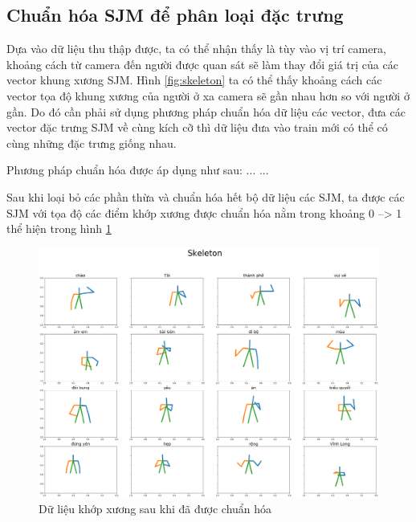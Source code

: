 \subsection{Chuẩn hóa SJM để phân loại đặc trưng}

Dựa vào dữ liệu thu thập được, ta có thể nhận thấy là tùy vào vị trí camera, khoảng cách từ camera đến người được quan sát sẽ làm thay đổi giá trị của các vector khung xương SJM. Hình \ref{fig:skeleton} ta có thể thấy khoảng cách các vector tọa độ khung xương của người ở xa camera sẽ gần nhau hơn so với người ở gần. Do đó cần phải sử dụng phương pháp chuẩn hóa dữ liệu các vector, đưa các vector đặc trưng SJM về cùng kích cỡ thì dữ liệu đưa vào train mới có thể có cùng những đặc trưng giống nhau.

Phương pháp chuẩn hóa được áp dụng như sau:
...
...




Sau khi loại bỏ các phần thừa và chuẩn hóa hết bộ dữ liệu các SJM, ta được các SJM với tọa độ các điểm khớp xương được chuẩn hóa nằm trong khoảng 0 --> 1 thể hiện trong hình \ref{fig:skeleton_normalize}
\FloatBarrier
\begin{figure}[htp]
\begin{center}
\includegraphics[scale=0.25]{chap4/c4_figs/datajoint.png}
\end{center}
\caption{Dữ liệu khớp xương sau khi đã được chuẩn hóa}
\label{fig:skeleton_normalize}
\end{figure}
\FloatBarrier

